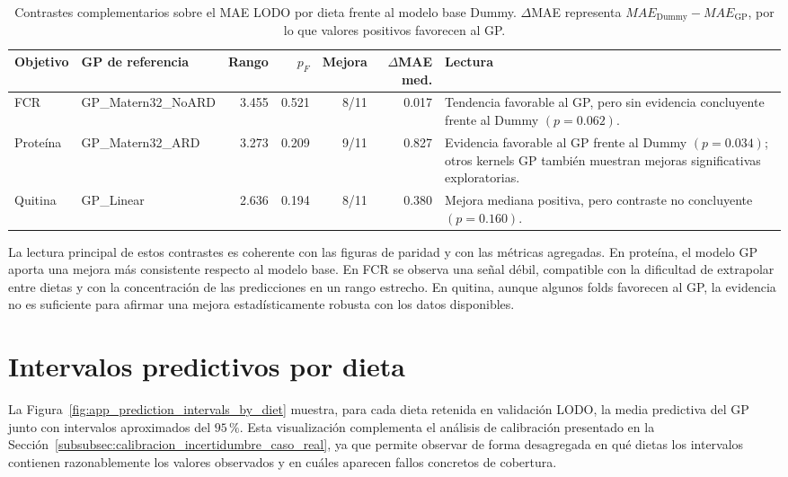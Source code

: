 \begin{table}[htbp]
\centering
\scriptsize
\caption[Contrastes LODO frente a Dummy]{Contrastes complementarios sobre el MAE LODO por dieta frente al modelo base Dummy. \(\Delta\)MAE representa \(MAE_{\mathrm{Dummy}}-MAE_{\mathrm{GP}}\), por lo que valores positivos favorecen al GP.}
\label{tab:app_lodo_dummy_contrasts}
\renewcommand{\arraystretch}{1.15}
\begin{tabularx}{\textwidth}{@{}p{1.4cm} p{2.7cm} r r r r X@{}}
\toprule
\textbf{Objetivo} & \textbf{GP de referencia} & \textbf{Rango} & \textbf{\(p_F\)} & \textbf{Mejora} & \textbf{\(\Delta\)MAE med.} & \textbf{Lectura} \\
\midrule
FCR & GP\_Matern32\_NoARD & 3.455 & 0.521 & 8/11 & 0.017 & Tendencia favorable al GP, pero sin evidencia concluyente frente al Dummy \((p=0.062)\). \\
Proteína & GP\_Matern32\_ARD & 3.273 & 0.209 & 9/11 & 0.827 & Evidencia favorable al GP frente al Dummy \((p=0.034)\); otros kernels GP también muestran mejoras significativas exploratorias. \\
Quitina & GP\_Linear & 2.636 & 0.194 & 8/11 & 0.380 & Mejora mediana positiva, pero contraste no concluyente \((p=0.160)\). \\
\bottomrule
\end{tabularx}
\end{table}
\FloatBarrier

La lectura principal de estos contrastes es coherente con las figuras de paridad y con las métricas agregadas. En proteína, el modelo GP aporta una mejora más consistente respecto al modelo base. En FCR se observa una señal débil, compatible con la dificultad de extrapolar entre dietas y con la concentración de las predicciones en un rango estrecho. En quitina, aunque algunos folds favorecen al GP, la evidencia no es suficiente para afirmar una mejora estadísticamente robusta con los datos disponibles.

\section{Intervalos predictivos por dieta}
\label{app:intervalos_prediccion_dieta}

La Figura~\ref{fig:app_prediction_intervals_by_diet} muestra, para cada dieta retenida en validación LODO, la media predictiva del GP junto con intervalos aproximados del \(95\,\%\). Esta visualización complementa el análisis de calibración presentado en la Sección~\ref{subsubsec:calibracion_incertidumbre_caso_real}, ya que permite observar de forma desagregada en qué dietas los intervalos contienen razonablemente los valores observados y en cuáles aparecen fallos concretos de cobertura.

